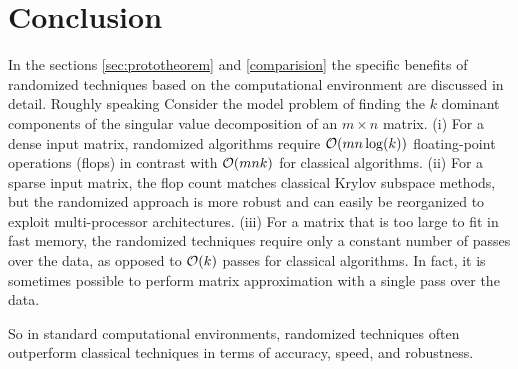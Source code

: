 \documentclass[12pt]{article}
\begin{document}



\section{Conclusion}
\label{sec:conclusion}

In the sections \ref{sec:prototheorem} and \ref{comparision} the specific benefits of randomized techniques based on the computational environment are discussed in detail. Roughly speaking Consider the model problem of finding
the $k$ dominant components of the singular value decomposition
of an $m \times n$ matrix.
(i) For a dense input matrix, randomized algorithms require $\mathcal{O}(mn
\log(k))$ floating-point operations (flops) in contrast with $
\mathcal{O}(mnk)$ for classical algorithms.
%
(ii) For a sparse input matrix, the flop count matches classical
Krylov subspace methods, but the randomized approach is more robust
and can easily be reorganized to exploit multi-processor architectures.
(iii) For a matrix that is too large to fit in fast memory, the randomized
techniques require only a constant number of passes over the data,
as opposed to $\mathcal{O}(k)$ passes for classical algorithms.
In fact, it is sometimes possible to perform matrix approximation with a
single pass over the data.

So in standard computational environments, randomized
techniques often outperform classical techniques in terms of
accuracy, speed, and robustness.

{}

\end{document}

